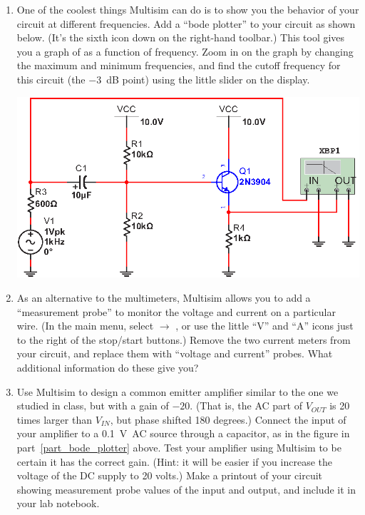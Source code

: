 \begin{enumerate}[wide]
\item One of the coolest things Multisim can do is to show you the behavior of your circuit at different frequencies.  Add a ``bode plotter'' to your circuit as shown below.  (It's the sixth icon down on the right-hand toolbar.)  This tool gives you a graph of   as a function of frequency.  Zoom in on the graph by changing the maximum and minimum frequencies, and find the cutoff frequency for this circuit (the $-3$~dB point) using the little slider on the display. \label{part_bode_plotter}
\begin{center}
\includegraphics{multisim/bode_plotter.eps}
\end{center}

\item As an alternative to the multimeters, Multisim allows you to add a ``measurement probe'' to monitor the voltage and current on a particular wire.  (In the main menu, select  $\longrightarrow$ , or use the little ``V'' and ``A'' icons just to the right of the stop/start buttons.)  Remove the two current meters from your circuit, and replace them with ``voltage and current'' probes.   What additional information do these give you?

\item Use Multisim to design a common emitter amplifier similar to the one we studied in class, but with a gain of  $-20$.  (That is, the AC part of $V_{OUT}$ is 20 times larger than $V_{IN}$, but phase shifted 180 degrees.)  Connect the input of your amplifier to a 0.1~V~AC source through a capacitor, as in the figure in part~\ref{part_bode_plotter} above.  Test your amplifier using Multisim to be certain it has the correct gain.  (Hint: it will be easier if you increase the voltage of the DC supply to 20 volts.)  Make a printout of your circuit showing measurement probe values of the input and output, and include it in your lab notebook. \label{part_emitter_follower}


\end{enumerate}
